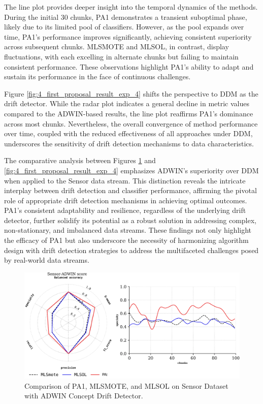 The line plot provides deeper insight into the temporal dynamics of the methods. During the initial 30 chunks, PA1 demonstrates a transient suboptimal phase, likely due to its limited pool of classifiers. However, as the pool expands over time, PA1's performance improves significantly, achieving consistent superiority across subsequent chunks. MLSMOTE and MLSOL, in contrast, display fluctuations, with each excelling in alternate chunks but failing to maintain consistent performance. These observations highlight PA1's ability to adapt and sustain its performance in the face of continuous challenges.

Figure \ref{fig:4_first_proposal_result_exp_4} shifts the perspective to DDM as the drift detector. While the radar plot indicates a general decline in metric values compared to the ADWIN-based results, the line plot reaffirms PA1's dominance across most chunks. Nevertheless, the overall convergence of method performance over time, coupled with the reduced effectiveness of all approaches under DDM, underscores the sensitivity of drift detection mechanisms to data characteristics.

The comparative analysis between Figures \ref{fig:4_first_proposal_result_exp_3} and \ref{fig:4_first_proposal_result_exp_4} emphasizes ADWIN's superiority over DDM when applied to the Sensor data stream. This distinction reveals the intricate interplay between drift detection and classifier performance, affirming the pivotal role of appropriate drift detection mechanisms in achieving optimal outcomes. PA1’s consistent adaptability and resilience, regardless of the underlying drift detector, further solidify its potential as a robust solution in addressing complex, non-stationary, and imbalanced data streams. These findings not only highlight the efficacy of PA1 but also underscore the necessity of harmonizing algorithm design with drift detection strategies to address the multifaceted challenges posed by real-world data streams.
 
\begin{figure}[!ht]
	\centering
	\includegraphics[width=1\linewidth]{4_Imbalanced/figures/exp_3.png}
  \caption{Comparison of PA1, MLSMOTE, and MLSOL on Sensor Dataset with ADWIN Concept Drift Detector.}
	\label{fig:4_first_proposal_result_exp_3}
\end{figure}

